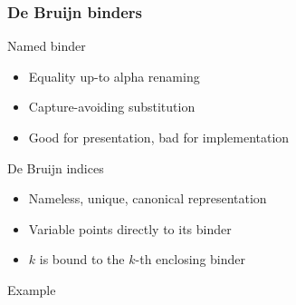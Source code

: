 \documentclass[xcolor={usenames,dvipsnames}]{beamer}
\begin{document}
\begin{frame}
  \frametitle{De Bruijn binders}
  \begin{block}{Named binder}
    \begin{itemize}
      \item Equality up-to alpha renaming
      \item Capture-avoiding substitution
      \item Good for presentation, bad for implementation
    \end{itemize}
  \end{block}

  \begin{block}{De Bruijn indices}
    \begin{itemize}
      \item Nameless, unique, canonical representation
      \item Variable points directly to its binder
      \item $k$ is bound to the $k$-th enclosing binder
    \end{itemize}
  \end{block}


  \begin{block}{Example}
    \begin{center}
      \LARGE{
      }
    \end{center}
  \end{block}


\end{frame}
\end{document}
